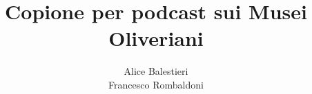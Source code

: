 \documentclass[hidelinks,12pt,a4paper]{article}
\begin{document}
	\begin{flushleft}
		
		\LARGE
		
		\title{\textbf{Copione per podcast sui Musei Oliveriani}}
		\author{Alice Balestieri\\Francesco Rombaldoni}
		\date{}
		
		\maketitle
		
		\setcounter{page}{1}
		\newpage
		
		\tableofcontents
		\newpage
		
		
		\vspace*{\fill}
		\doclicenseThis
	\end{flushleft}
\end{document}
